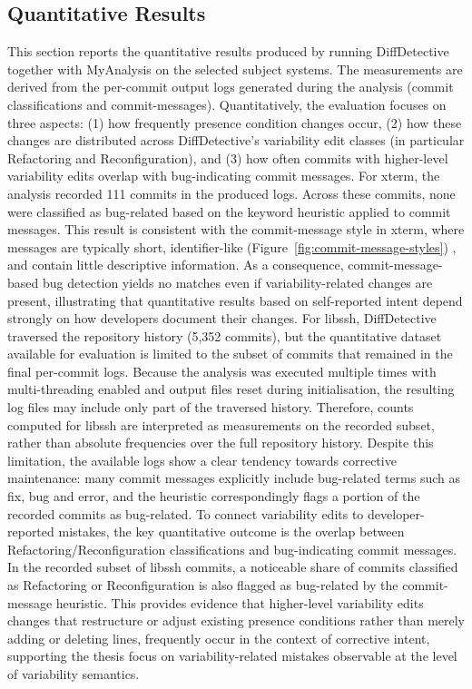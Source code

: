 \subsection{Quantitative Results}
This section reports the quantitative results produced by running DiffDetective together with MyAnalysis on the selected subject systems. The measurements are derived from the per-commit output logs generated during the analysis (commit classifications and commit-messages). Quantitatively, the evaluation focuses on three aspects: (1) how frequently presence condition changes occur, (2) how these changes are distributed across DiffDetective’s variability edit classes (in particular Refactoring and Reconfiguration), and (3) how often commits with higher-level variability edits overlap with bug-indicating commit messages.
For xterm, the analysis recorded 111 commits in the produced logs. Across these commits, none were classified as bug-related based on the keyword heuristic applied to commit messages. This result is consistent with the commit-message style in xterm, where messages are typically short, identifier-like (Figure~\ref{fig:commit-message-styles}) , and contain little descriptive information. As a consequence, commit-message-based bug detection yields no matches even if variability-related changes are present, illustrating that quantitative results based on self-reported intent depend strongly on how developers document their changes.
For libssh, DiffDetective traversed the repository history (5,352 commits), but the quantitative dataset available for evaluation is limited to the subset of commits that remained in the final per-commit logs. Because the analysis was executed multiple times with multi-threading enabled and output files reset during initialisation, the resulting log files may include only part of the traversed history. Therefore, counts computed for libssh are interpreted as measurements on the recorded subset, rather than absolute frequencies over the full repository history. Despite this limitation, the available logs show a clear tendency towards corrective maintenance: many commit messages explicitly include bug-related terms such as fix, bug and error, and the heuristic correspondingly flags a portion of the recorded commits as bug-related.
To connect variability edits to developer-reported mistakes, the key quantitative outcome is the overlap between Refactoring/Reconfiguration classifications and bug-indicating commit messages. In the recorded subset of libssh commits, a noticeable share of commits classified as Refactoring or Reconfiguration is also flagged as bug-related by the commit-message heuristic. This provides evidence that higher-level variability edits changes that restructure or adjust existing presence conditions rather than merely adding or deleting lines, frequently occur in the context of corrective intent, supporting the thesis focus on variability-related mistakes observable at the level of variability semantics.
